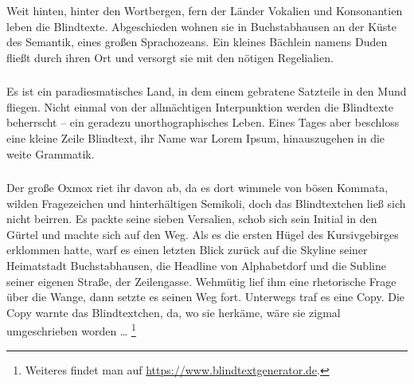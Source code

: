 \subsubsection{}
Weit hinten, hinter den Wortbergen, fern der Länder Vokalien und Konsonantien leben die Blindtexte. 
Abgeschieden wohnen sie in Buchstabhausen an der Küste des Semantik, eines großen Sprachozeans. 
Ein kleines Bächlein namens Duden fließt durch ihren Ort und versorgt sie mit den nötigen Regelialien. 
\subsubsection{}
Es ist ein paradiesmatisches Land, in dem einem gebratene Satzteile in den Mund fliegen. 
Nicht einmal von der allmächtigen Interpunktion werden die Blindtexte beherrscht -- ein geradezu unorthographisches Leben. 
Eines Tages aber beschloss eine kleine Zeile Blindtext, ihr Name war Lorem Ipsum, hinauszugehen in die weite Grammatik. 
\subsubsection{}
Der große Oxmox riet ihr davon ab, da es dort wimmele von bösen Kommata, wilden Fragezeichen und hinterhältigen Semikoli, doch das Blindtextchen ließ sich nicht beirren. 
Es packte seine sieben Versalien, schob sich sein Initial in den Gürtel und machte sich auf den Weg. 
Als es die ersten Hügel des Kursivgebirges erklommen hatte, warf es einen letzten Blick zurück auf die Skyline seiner Heimatstadt Buchstabhausen, die Headline von Alphabetdorf und die Subline seiner eigenen Straße, der Zeilengasse. 
Wehmütig lief ihm eine rhetorische Frage über die Wange, dann setzte es seinen Weg fort. 
Unterwegs traf es eine Copy.
Die Copy warnte das Blindtextchen, da, wo sie herkäme, wäre sie zigmal umgeschrieben worden \ldots%
\footnote{Weiteres findet man auf \url{https://www.blindtextgenerator.de}.}
